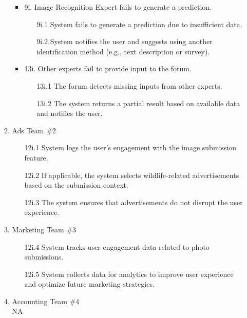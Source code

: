 \documentclass[]{article}
\begin{document}
\begin{enumerate}[{\bf BE1.}]
\begin{enumerate}[{\bf VP1.}]
\begin{itemize}
    \item 9i. Image Recognition Expert fails to generate a prediction.
    \begin{enumerate}
        \item[9i.1] System fails to generate a prediction due to insufficient data.
        \item[9i.2] System notifies the user and suggests using another identification method (e.g., text description or survey).
    \end{enumerate}

    \item 13i. Other experts fail to provide input to the forum.
    \begin{enumerate}
        \item[13i.1] The forum detects missing inputs from other experts.
        \item[13i.2] The system returns a partial result based on available data and notifies the user.
    \end{enumerate}
\end{itemize}
    

		\item Ads Team \#2 \\
\begin{enumerate}
    \item [12i.1] System logs the user's engagement with the image submission feature.
    \item [12i.2] If applicable, the system selects wildlife-related advertisements based on the submission context.
    \item [12i.3] The system ensures that advertisements do not disrupt the user experience.
\end{enumerate}

            \item Marketing Team \#3 \\
\begin{enumerate}
    \item [12i.4] System tracks user engagement data related to photo submissions.
    \item [12i.5] System collects data for analytics to improve user experience and optimize future marketing strategies.
\end{enumerate}


            \item Accounting Team \#4 \\
        \newline NA



\end{enumerate}
\end{enumerate}
\end{document}
